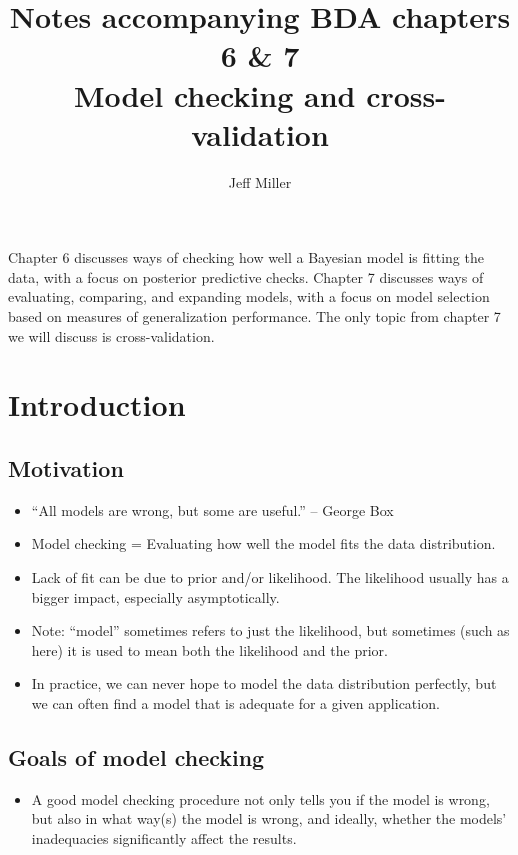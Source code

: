 \documentclass[12pt]{article}
\title{Notes accompanying BDA chapters 6 \& 7\\
\large Model checking and cross-validation
}
\author{Jeff Miller}
\begin{document}
\maketitle

\tableofcontents

\vspace{2em}

Chapter 6 discusses ways of checking how well a Bayesian model is fitting the data, with a focus on posterior predictive checks. Chapter 7 discusses ways of evaluating, comparing, and expanding models, with a focus on model selection based on measures of generalization performance. The only topic from chapter 7 we will discuss is cross-validation.

\section{Introduction}

\subsection*{Motivation}
\begin{itemize}
\item ``All models are wrong, but some are useful.'' -- George Box
\item Model checking = Evaluating how well the model fits the data distribution.
\item Lack of fit can be due to prior and/or likelihood. The likelihood usually has a bigger impact, especially asymptotically.
\item Note: ``model'' sometimes refers to just the likelihood, but sometimes (such as here) it is used to mean both the likelihood and the prior.
\item In practice, we can never hope to model the data distribution perfectly, but we can often find a model that is adequate for a given application.
\end{itemize}

\subsection*{Goals of model checking}
\begin{itemize}
\item A good model checking procedure not only tells you if the model is wrong, but also in what way(s) the model is wrong, and ideally, whether the models' inadequacies significantly affect the results.
\end{itemize}
\end{document}
